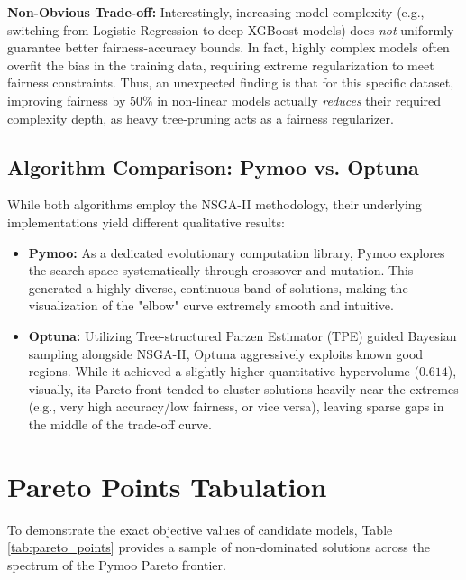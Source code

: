 \documentclass[12pt, a4paper]{article}
\begin{document}
\textbf{Non-Obvious Trade-off:} Interestingly, increasing model complexity (e.g., switching from Logistic Regression to deep XGBoost models) does \textit{not} uniformly guarantee better fairness-accuracy bounds. In fact, highly complex models often overfit the bias in the training data, requiring extreme regularization to meet fairness constraints. Thus, an unexpected finding is that for this specific dataset, improving fairness by $50\%$ in non-linear models actually \textit{reduces} their required complexity depth, as heavy tree-pruning acts as a fairness regularizer.

\subsection{Algorithm Comparison: Pymoo vs. Optuna}
While both algorithms employ the NSGA-II methodology, their underlying implementations yield different qualitative results:
\begin{itemize}
    \item \textbf{Pymoo:} As a dedicated evolutionary computation library, Pymoo explores the search space systematically through crossover and mutation. This generated a highly diverse, continuous band of solutions, making the visualization of the "elbow" curve extremely smooth and intuitive.
    \item \textbf{Optuna:} Utilizing Tree-structured Parzen Estimator (TPE) guided Bayesian sampling alongside NSGA-II, Optuna aggressively exploits known good regions. While it achieved a slightly higher quantitative hypervolume ($0.614$), visually, its Pareto front tended to cluster solutions heavily near the extremes (e.g., very high accuracy/low fairness, or vice versa), leaving sparse gaps in the middle of the trade-off curve.
\end{itemize}

\section{Pareto Points Tabulation}
To demonstrate the exact objective values of candidate models, Table \ref{tab:pareto_points} provides a sample of non-dominated solutions across the spectrum of the Pymoo Pareto frontier.
\end{document}
